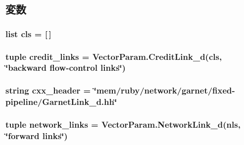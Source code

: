 \subsection{変数}
\hypertarget{classGarnetLink__d_1_1GarnetExtLink__d_ac7f071e45f9ddbded3db29efda614876}{
\subsubsection[{cls}]{\setlength{\rightskip}{0pt plus 5cm}list {\bf cls} = \mbox{[}$\,$\mbox{]}}}
\label{classGarnetLink__d_1_1GarnetExtLink__d_ac7f071e45f9ddbded3db29efda614876}
\hypertarget{classGarnetLink__d_1_1GarnetExtLink__d_a1cb258d6b6f19b0fe2d904ca97ebd474}{
\subsubsection[{credit\_\-links}]{\setlength{\rightskip}{0pt plus 5cm}tuple {\bf credit\_\-links} = VectorParam.CreditLink\_\-d({\bf cls}, \char`\"{}backward flow-\/control links\char`\"{})}}
\label{classGarnetLink__d_1_1GarnetExtLink__d_a1cb258d6b6f19b0fe2d904ca97ebd474}
\hypertarget{classGarnetLink__d_1_1GarnetExtLink__d_a17da7064bc5c518791f0c891eff05fda}{
\subsubsection[{cxx\_\-header}]{\setlength{\rightskip}{0pt plus 5cm}string {\bf cxx\_\-header} = \char`\"{}mem/ruby/network/garnet/fixed-\/pipeline/GarnetLink\_\-d.hh\char`\"{}}}
\label{classGarnetLink__d_1_1GarnetExtLink__d_a17da7064bc5c518791f0c891eff05fda}
\hypertarget{classGarnetLink__d_1_1GarnetExtLink__d_a8bbf0848b3bec491562615b151d5c318}{
\subsubsection[{network\_\-links}]{\setlength{\rightskip}{0pt plus 5cm}tuple {\bf network\_\-links} = VectorParam.NetworkLink\_\-d({\bf nls}, \char`\"{}forward links\char`\"{})}}
